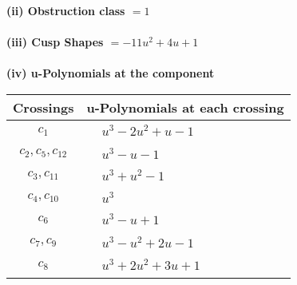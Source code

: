 \documentclass[1p]{elsarticle_modified}
\theoremstyle{definition}
\begin{document}
\flushleft \textbf{(ii) Obstruction class $= 1$}\\~\\
\flushleft \textbf{(iii) Cusp Shapes $= -11 u^2+4 u+1$}\\~\\
\newpage\renewcommand{\arraystretch}{1}
\flushleft \textbf{(iv) u-Polynomials at the component}\newline \\
\begin{tabular}{m{50pt}|m{274pt}}
Crossings & \hspace{64pt}u-Polynomials at each crossing \\
\hline $$\begin{aligned}c_{1}\end{aligned}$$&$\begin{aligned}
&u^3-2 u^2+u-1
\end{aligned}$\\
\hline $$\begin{aligned}c_{2},c_{5},c_{12}\end{aligned}$$&$\begin{aligned}
&u^3- u-1
\end{aligned}$\\
\hline $$\begin{aligned}c_{3},c_{11}\end{aligned}$$&$\begin{aligned}
&u^3+u^2-1
\end{aligned}$\\
\hline $$\begin{aligned}c_{4},c_{10}\end{aligned}$$&$\begin{aligned}
&u^3
\end{aligned}$\\
\hline $$\begin{aligned}c_{6}\end{aligned}$$&$\begin{aligned}
&u^3- u+1
\end{aligned}$\\
\hline $$\begin{aligned}c_{7},c_{9}\end{aligned}$$&$\begin{aligned}
&u^3- u^2+2 u-1
\end{aligned}$\\
\hline $$\begin{aligned}c_{8}\end{aligned}$$&$\begin{aligned}
&u^3+2 u^2+3 u+1
\end{aligned}$\\
\hline
\end{tabular}\\~\\
\end{document}
